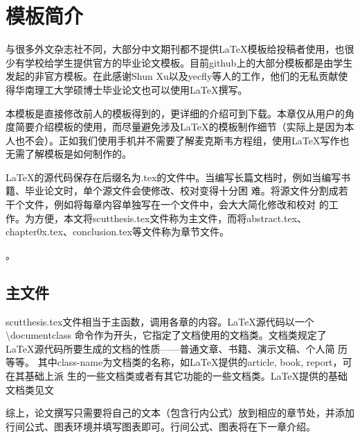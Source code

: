 \chapter{模板简介}
%
与很多外文杂志社不同，大部分中文期刊都不提供\LaTeX{}模板给投稿者使用，也很少有学校给学生提供官方的毕业论文模板。目前github上的大部分模板都是由学生发起的非官方模板。在此感谢Shun Xu以及yecfly等人的工作，他们的无私贡献使得华南理工大学硕博士毕业论文也可以使用\LaTeX{}撰写。

本模板是直接修改前人的模板得到的，更详细的介绍可到下载。本章仅从用户的角度简要介绍模板的使用，而尽量避免涉及\LaTeX{}的模板制作细节（实际上是因为本人也不会）。正如我们使用手机并不需要了解麦克斯韦方程组，使用\LaTeX{}写作也无需了解模板是如何制作的。

\LaTeX{}的源代码保存在后缀名为.tex的文件中。当编写长篇文档时，例如当编写书籍、毕业论文时，单个源文件会使修改、校对变得十分困
难。将源文件分割成若干个文件，例如将每章内容单独写在一个文件中，会大大简化修改和校对
的工作。为方便，本文将scutthesis.tex文件称为主文件，而将abstract.tex、chapter0x.tex、conclusion.tex等文件称为章节文件。

。

\section{主文件}
scutthesis.tex文件相当于主函数，调用各章的内容。\LaTeX{}源代码以一个\textbackslash{}documentclass 命令作为开头，它指定了文档使用的文档类。文档类规定了\LaTeX{}源代码所要生成的文档的性质——普通文章、书籍、演示文稿、个人简
历等等。
其中class-name为文档类的名称，如\LaTeX{}提供的article, book, report，可在其基础上派
生的一些文档类或者有其它功能的一些文档类。\LaTeX{}提供的基础文档类见文







综上，论文撰写只需要将自己的文本（包含行内公式）放到相应的章节处，并添加行间公式、图表环境并填写图表即可。行间公式、图表将在下一章介绍。

